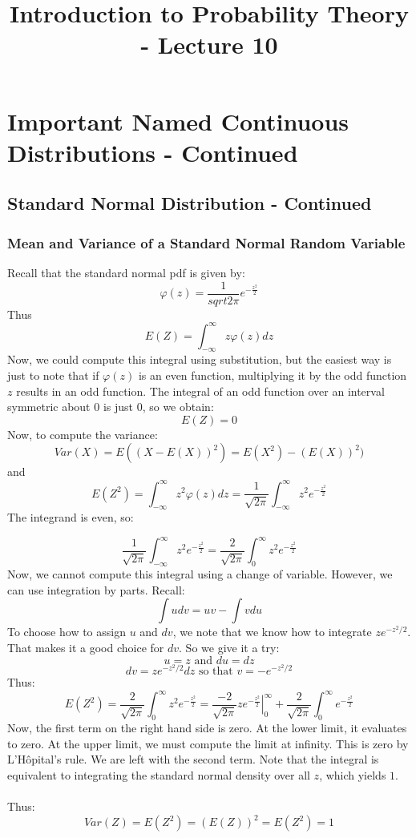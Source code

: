 \documentclass[12pt]{article} %
\title{Introduction to Probability Theory - Lecture 10}
\begin{document}
\maketitle

\section{Important Named Continuous Distributions - Continued}
\subsection{Standard Normal Distribution - Continued}
\subsubsection{Mean and Variance of a Standard Normal Random Variable}
Recall that the standard normal pdf is given by:
$$\varphi(z) = \frac1{sqrt{2\pi}}e^{-\frac{z^2}2}$$
Thus
$$E(Z) = \int_{-\infty}^{\infty}z\varphi(z) dz$$
Now, we could compute this integral using substitution, but the easiest way is just to note that if $\varphi(z)$ is an even function, multiplying it by the odd function $z$ results in an odd function. The integral of an odd function over an interval symmetric about $0$ is just 0, so we obtain:
$$E(Z) = 0$$ 
Now, to compute the variance:
$$Var(X) = E((X-E(X))^2) = E(X^2) - \left(E(X)\right)^2)$$
and
$$E(Z^2) = \int_{-\infty}^{\infty} z^2 \varphi(z) dz = \frac1{\sqrt{2\pi}}\int_{-\infty}^{\infty} z^2e^{-\frac{z^2}2} $$
The integrand is even, so:

$$ \frac1{\sqrt{2\pi}}\int_{-\infty}^{\infty} z^2e^{-\frac{z^2}2} =  \frac2{\sqrt{2\pi}}\int_{0}^{\infty} z^2e^{-\frac{z^2}2} $$
Now, we cannot compute this integral using a change of variable. However, we can use integration by parts. Recall:
$$\int u dv = uv - \int v du$$
To choose how to assign $u$ and $dv$, we note that we know how to integrate $ze^{-z^2/2}$. That makes it a good choice for $dv$. So we give it a try:
$$u=z \textrm{ and } du=dz$$
$$dv = ze^{-z^2/2}dz \textrm{ so that } v = -e^{-z^2/2}$$
Thus:
$$E(Z^2) =  \frac2{\sqrt{2\pi}}\int_{0}^{\infty} z^2e^{-\frac{z^2}2} = \frac{-2}{\sqrt{2\pi}} \left.z e^{-\frac{z^2}2}\right\rvert_0^\infty + \frac2{\sqrt{2\pi}}\int_{0}^{\infty} e^{-\frac{z^2}2}$$
Now, the first term on the right hand side is zero. At the lower limit, it evaluates to zero. At the upper limit, we must compute the limit at infinity. This is zero by L'H\^opital's rule. We are left with the second term. Note that the integral is equivalent to integrating the standard normal density over all $z$, which yields $1$.\\\\
Thus:
$$Var(Z) = E(Z^2) = \left(E(Z)\right)^2 = E(Z^2) = 1$$
\end{document}
